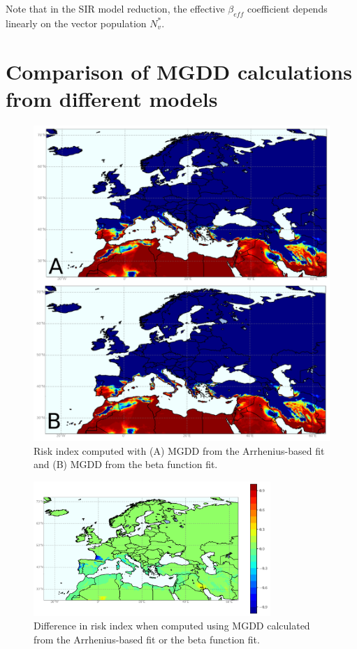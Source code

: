 Note that in the SIR model reduction, the effective $\beta_{eff}$
coefficient depends linearly on the vector population $N_v^*$.

\section{Comparison of MGDD calculations from different models}

\begin{figure}[H]
    \centering
    \includegraphics[width=\textwidth]{Figures/Risk_risk_beta.png}
    \caption[Comparison of Arrhenius-based vs beta function to define
        MGDD]{Risk index computed with
        (A) MGDD from the Arrhenius-based fit and
        (B) MGDD from the beta function fit.}
    \label{fig:R2} %
\end{figure}

\begin{figure}[H]
    \centering

    \includegraphics[width=0.8\textwidth]{Figures/Diff_risk_beta_minus_risk.png}
    \caption[Difference on risk index using MGDD defined with an Arrhenius or
        beta function]{Difference in risk index when computed using MGDD
        calculated from the Arrhenius-based fit or the beta function fit.}
    \label{fig:R3} %
\end{figure}

